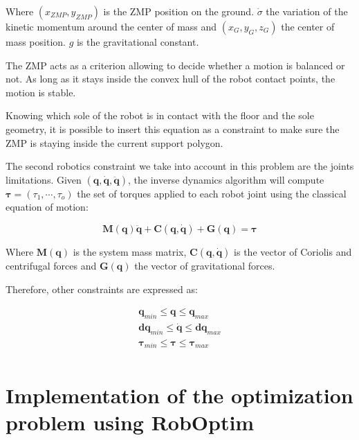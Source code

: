 \documentclass[letterpaper, 10 pt, conference]{ieeeconf}  %
\begin{document}
Where $(x_{ZMP}, y_{ZMP})$ is the ZMP position on the
ground. $\dot{\sigma}$ the variation of the kinetic momentum around
the center of mass and $(x_G, y_G, z_G)$ the center of mass
position. $g$ is the gravitational constant.

The ZMP acts as a criterion allowing to decide whether a motion is
balanced or not. As long as it stays inside the convex hull of the
robot contact points, the motion is stable.

Knowing which sole of the robot is in contact with the floor and the
sole geometry, it is possible to insert this equation as a constraint
to make sure the ZMP is staying inside the current support polygon.


The second robotics constraint we take into account in this problem
are the joints limitations. Given $(\mathbf{q}, \dot{\mathbf{q}},
\ddot{\mathbf{q}})$, the inverse dynamics algorithm \cite{FIXME} will
compute $\mathbf{\tau} = (\tau_1, \cdots, \tau_o)$ the set of torques
applied to each robot joint using the classical equation of motion:

\begin{equation}
  \mathbf{M}(\mathbf{q}) \ddot{\mathbf{q}} + \mathbf{C}(\mathbf{q},
  \dot{\mathbf{q}}) + \mathbf{G}(\mathbf{q}) = \mathbf{\tau}
\end{equation}

Where $\mathbf{M}(\mathbf{q})$ is the system mass matrix,
$\mathbf{C}(\mathbf{q}, \dot{\mathbf{q}})$ is the vector of Coriolis
and centrifugal forces and $\mathbf{G}(\mathbf{q})$ the vector of
gravitational forces.

Therefore, other constraints are expressed as:

\begin{equation}
  \begin{array}{ccc}
    \mathbf{q}_{min} \leq \mathbf{q} \leq \mathbf{q}_{max} \\
    \mathbf{dq}_{min} \leq \dot{\mathbf{q}} \leq \mathbf{dq}_{max} \\
    \mathbf{\tau}_{min} \leq \mathbf{\tau} \leq \mathbf{\tau}_{max} \\
    \end{array}
\end{equation}



\section{Implementation of the optimization problem using RobOptim}
\label{sec:implementation}
\end{document}
